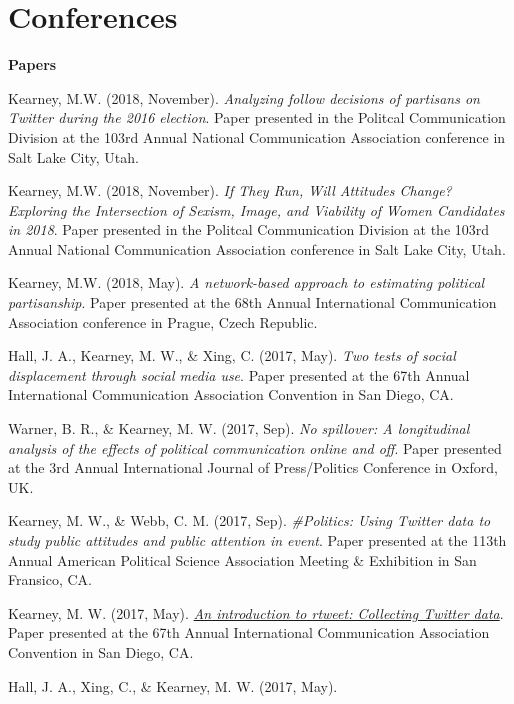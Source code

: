 \section{Conferences}

{\large\textbf{Papers}} \vspace{.5em}
  \begin{bibenum}
    \item[] Kearney, M.W. (2018, November).
      \textit{Analyzing follow decisions of partisans on Twitter during the 2016 election}.
      Paper presented in the Politcal Communication Division at the 103rd Annual National Communication Association conference in Salt Lake City, Utah.
    \item[] Kearney, M.W. (2018, November).
      \textit{If They Run, Will Attitudes Change? Exploring the Intersection of Sexism, Image, and Viability of Women Candidates in 2018}.
      Paper presented in the Politcal Communication Division at the 103rd Annual National Communication Association conference in Salt Lake City, Utah.
    \item[] Kearney, M.W. (2018, May).
      \textit{A network-based approach to estimating political partisanship}.
      Paper presented at the 68th Annual International Communication Association conference in Prague, Czech Republic.
    \item[] Hall, J. A., Kearney, M. W., \& Xing, C. (2017, May).
      \textit{Two tests of social displacement through social media use}.
      Paper presented at the 67th Annual International Communication Association Convention in San Diego, CA.
    \item[] Warner, B. R., \& Kearney, M. W. (2017, Sep).
      \textit{No spillover: A longitudinal analysis of the effects of political communication online and off}.
      Paper presented at the 3rd Annual International Journal of Press/Politics Conference in Oxford, UK.
    \item[] Kearney, M. W., \& Webb, C. M. (2017, Sep).
      \textit{\#Politics: Using Twitter data to study public attitudes and public attention in event}.
      Paper presented at the 113th Annual American Political Science Association Meeting \& Exhibition in San Fransico, CA.
    \item[] Kearney, M. W. (2017, May).
      \href{https://mkearney.github.io/ica17/}{\textit{An introduction to rtweet: Collecting Twitter data}}.
      Paper presented at the 67th Annual International Communication Association Convention in San Diego, CA.
    \item[] Hall, J. A., Xing, C., \& Kearney, M. W. (2017, May).

\end{bibenum}
